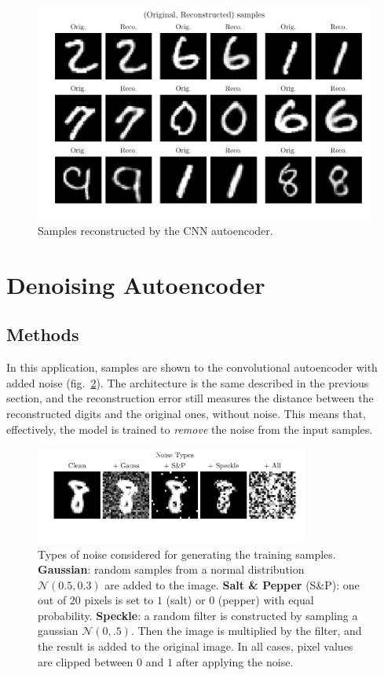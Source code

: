 \documentclass[11pt,a4paper]{scrartcl}
\begin{document}
\begin{figure}[H]
    \centering
    \includegraphics[width=\textwidth]{../Code/Plots/orig_reconstructed}
    \caption{Samples reconstructed by the CNN autoencoder.\label{fig:samples_cnn}}
\end{figure}

\section{Denoising Autoencoder\label{sec:cnn_denoiser}}
\subsection{Methods}
In this application, samples are shown to the convolutional autoencoder with added noise (fig.~\ref{fig:noise_types}). The architecture is the same described in the previous section, and the reconstruction error still measures the distance between the reconstructed digits and the original ones, without noise. This means that, effectively, the model is trained to \textit{remove} the noise from the input samples.

\begin{figure}[H]
    \centering
    \includegraphics[width=0.8\textwidth]{../Code/Plots/noise_types}
    \vspace{-2em}
    \caption{Types of noise considered for generating the training samples. \textbf{Gaussian}: random samples from a normal distribution $\mathcal{N}(0.5, 0.3)$ are added to the image. \textbf{Salt \& Pepper} (S\&P): one out of $20$ pixels is set to $1$ (salt) or $0$ (pepper) with equal probability. \textbf{Speckle}: a random filter is constructed by sampling a gaussian $\mathcal{N}(0, .5)$. Then the image is multiplied by the filter, and the result is added to the original image. In all cases, pixel values are clipped between $0$ and $1$ after applying the noise. \label{fig:noise_types}}
\end{figure}
\end{document}
